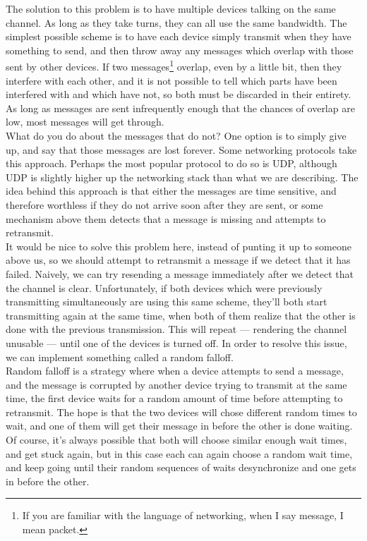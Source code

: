 \documentclass{article}
\begin{document}
The solution to this problem is to have multiple devices talking on the same channel. As long as they take turns, they can all use the same bandwidth. The simplest possible scheme is to have each device simply transmit when they have something to send, and then throw away any messages which overlap with those sent by other devices. If two messages\footnote{If you are familiar with the language of networking, when I say message, I mean packet.} overlap, even by a little bit, then they interfere with each other, and it is not possible to tell which parts have been interfered with and which have not, so both must be discarded in their entirety. As long as messages are sent infrequently enough that the chances of overlap are low, most messages will get through.\\

What do you do about the messages that do not? One option is to simply give up, and say that those messages are lost forever. Some networking protocols take this approach. Perhaps the most popular protocol to do so is UDP, although UDP is slightly higher up the networking stack than what we are describing. The idea behind this approach is that either the messages are time sensitive, and therefore worthless if they do not arrive soon after they are sent, or some mechanism above them detects that a message is missing and attempts to retransmit.\\

It would be nice to solve this problem here, instead of punting it up to someone above us, so we should attempt to retransmit a message if we detect that it has failed. Naively, we can try resending a message immediately after we detect that the channel is clear. Unfortunately, if both devices which were previously transmitting simultaneously are using this same scheme, they’ll both start transmitting again at the same time, when both of them realize that the other is done with the previous transmission. This will repeat --- rendering the channel unusable --- until one of the devices is turned off. In order to resolve this issue, we can implement something called a random falloff.\\

Random falloff is a strategy where when a device attempts to send a message, and the message is corrupted by another device trying to transmit at the same time, the first device waits for a random amount of time before attempting to retransmit. The hope is that the two devices will chose different random times to wait, and one of them will get their message in before the other is done waiting. Of course, it’s always possible that both will choose similar enough wait times, and get stuck again, but in this case each can again choose a random wait time, and keep going until their random sequences of waits desynchronize and one gets in before the other.\\
\end{document}
